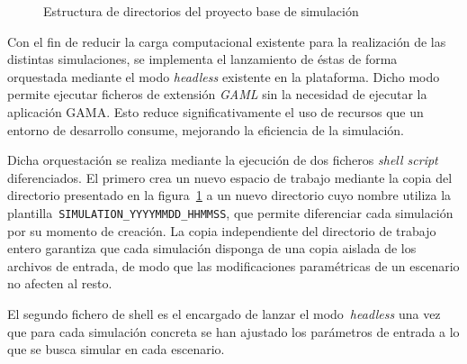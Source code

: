 \begin{figure}[H]
\centering
\begin{minipage}{0.8\linewidth}
\end{minipage}
\caption{Estructura de directorios del proyecto base de simulación}
\label{fig:structure_hierarchy}
\par\vspace{4pt}{\footnotesize Fuente: elaboración propia.}
\end{figure}

Con el fin de reducir la carga computacional existente para la realización de las distintas simulaciones, se implementa
el lanzamiento de éstas de forma orquestada mediante el modo \textit{headless} existente en la plataforma. Dicho modo permite
ejecutar ficheros de extensión \textit{GAML} sin la necesidad de ejecutar la aplicación GAMA. Esto reduce significativamente el 
uso de recursos que un entorno de desarrollo consume, mejorando la eficiencia de la simulación.

Dicha orquestación se realiza mediante la ejecución de dos ficheros \textit{shell script} diferenciados. El primero crea un 
nuevo espacio de trabajo mediante la copia del directorio presentado en la figura~\ref{fig:structure_hierarchy}
a un nuevo directorio cuyo nombre utiliza la plantilla~\texttt{SIMULATION\_YYYYMMDD\_HHMMSS}, que 
permite diferenciar cada simulación por su momento de creación. La copia independiente del directorio de trabajo entero 
garantiza que cada simulación disponga de una copia aislada de los archivos de entrada, de modo que las modificaciones 
paramétricas de un escenario no afecten al resto.

El segundo fichero de shell es el encargado de lanzar el modo~\textit{headless} una vez que para cada simulación concreta se han 
ajustado los parámetros de entrada a lo que se busca simular en cada escenario.

